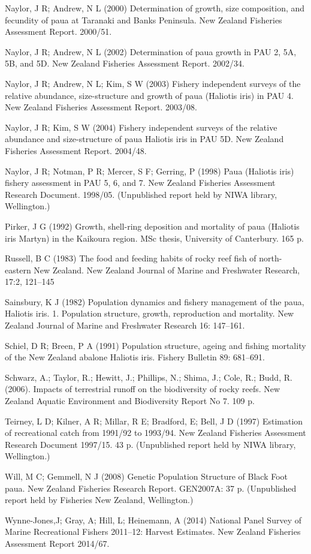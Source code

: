 \documentclass{mpi-plenary}
\theoremstyle{definition}
\theoremstyle{definition}
\theoremstyle{definition}
\theoremstyle{remark}
\begin{document}
Naylor, J R; Andrew, N L (2000) Determination of growth, size
composition, and fecundity of paua at Taranaki and Banks Peninsula. New
Zealand Fisheries Assessment Report. 2000/51.

Naylor, J R; Andrew, N L (2002) Determination of paua growth in PAU 2,
5A, 5B, and 5D. New Zealand Fisheries Assessment Report. 2002/34.

Naylor, J R; Andrew, N L; Kim, S W (2003) Fishery independent surveys of
the relative abundance, size-structure and growth of paua (Haliotis
iris) in PAU 4. New Zealand Fisheries Assessment Report. 2003/08.

Naylor, J R; Kim, S W (2004) Fishery independent surveys of the relative
abundance and size-structure of paua Haliotis iris in PAU 5D. New
Zealand Fisheries Assessment Report. 2004/48.

Naylor, J R; Notman, P R; Mercer, S F; Gerring, P (1998) Paua (Haliotis
iris) fishery assessment in PAU 5, 6, and 7. New Zealand Fisheries
Assessment Research Document. 1998/05. (Unpublished report held by NIWA
library, Wellington.)

Pirker, J G (1992) Growth, shell-ring deposition and mortality of paua
(Haliotis iris Martyn) in the Kaikoura region. MSc thesis, University of
Canterbury. 165 p.

Russell, B C (1983) The food and feeding habits of rocky reef fish of
north-eastern New Zealand. New Zealand Journal of Marine and Freshwater
Research, 17:2, 121--145

Sainsbury, K J (1982) Population dynamics and fishery management of the
paua, Haliotis iris. 1. Population structure, growth, reproduction and
mortality. New Zealand Journal of Marine and Freshwater Research 16:
147--161.

Schiel, D R; Breen, P A (1991) Population structure, ageing and fishing
mortality of the New Zealand abalone Haliotis iris. Fishery Bulletin 89:
681--691.

Schwarz, A.; Taylor, R.; Hewitt, J.; Phillips, N.; Shima, J.; Cole, R.;
Budd, R. (2006). Impacts of terrestrial runoff on the biodiversity of
rocky reefs. New Zealand Aquatic Environment and Biodiversity Report No
7. 109 p.

Teirney, L D; Kilner, A R; Millar, R E; Bradford, E; Bell, J D (1997)
Estimation of recreational catch from 1991/92 to 1993/94. New Zealand
Fisheries Assessment Research Document 1997/15. 43 p. (Unpublished
report held by NIWA library, Wellington.)

Will, M C; Gemmell, N J (2008) Genetic Population Structure of Black
Foot paua. New Zealand Fisheries Research Report. GEN2007A: 37 p.
(Unpublished report held by Fisheries New Zealand, Wellington.)

Wynne-Jones,J; Gray, A; Hill, L; Heinemann, A (2014) National Panel
Survey of Marine Recreational Fishers 2011--12: Harvest Estimates. New
Zealand Fisheries Assessment Report 2014/67.

\end{document}
